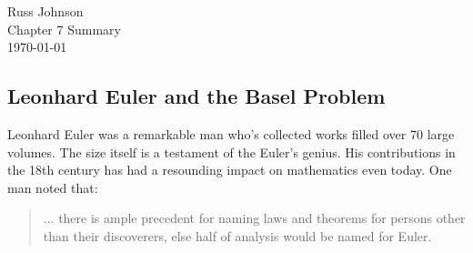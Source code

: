 \documentclass[12pt]{article}
\begin{document}
\begin{flushright}
Russ Johnson\\
Chapter 7 Summary\\
\today\\
\end{flushright}

\begin{doublespace}

\section*{Leonhard Euler and the Basel Problem}
Leonhard Euler was a remarkable man who's collected works filled over 70 large volumes. The size itself is a testament of the Euler's genius. His contributions in the 18th century has had a resounding impact on mathematics even today. One man noted that:
%
\end{doublespace}
\vspace{-5mm}
\begin{quote}
... there is ample precedent for naming laws and theorems for persons    
other than their discoverers, else half of analysis would be named for Euler.
\end{quote}
\vspace{-5mm}
\end{document}
